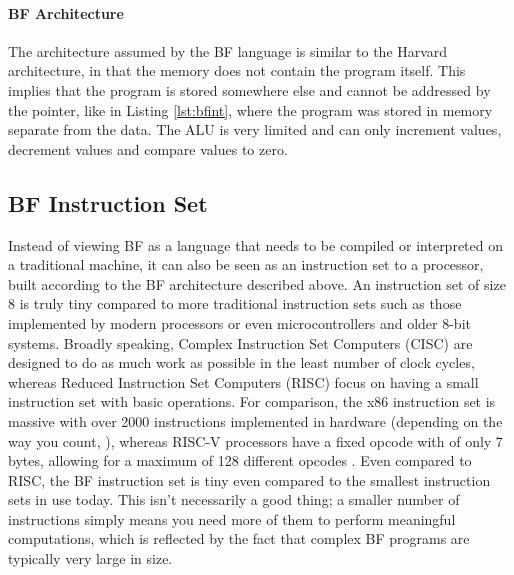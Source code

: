 \paragraph{BF Architecture} The architecture assumed by the BF language is similar to the Harvard architecture, in that the memory does not contain the program itself. This implies that the program is stored somewhere else and cannot be addressed by the pointer, like in Listing \ref{lst:bfint}, where the program was stored in memory separate from the data. The ALU is very limited and can only increment values, decrement values and compare values to zero.


\subsection{BF Instruction Set}
Instead of viewing BF as a language that needs to be compiled or interpreted on a traditional machine, it can also be seen as an instruction set to a processor, built according to the BF architecture described above. An instruction set of size 8 is truly tiny compared to more traditional instruction sets such as those implemented by modern processors or even microcontrollers and older 8-bit systems. Broadly speaking, Complex Instruction Set Computers (CISC) are designed to do as much work as possible in the least number of clock cycles, whereas Reduced Instruction Set Computers (RISC) focus on having a small instruction set with basic operations. For comparison, the x86 instruction set is massive with over 2000 instructions implemented in hardware (depending on the way you count, \cite{stefanheule}), whereas RISC-V processors have a fixed opcode with of only 7 bytes, allowing for a maximum of 128 different opcodes \cite{danielmangum}. Even compared to RISC, the BF instruction set is tiny even compared to the smallest instruction sets in use today. This isn't necessarily a good thing; a smaller number of instructions simply means you need more of them to perform meaningful computations, which is reflected by the fact that complex BF programs are typically very large in size.

